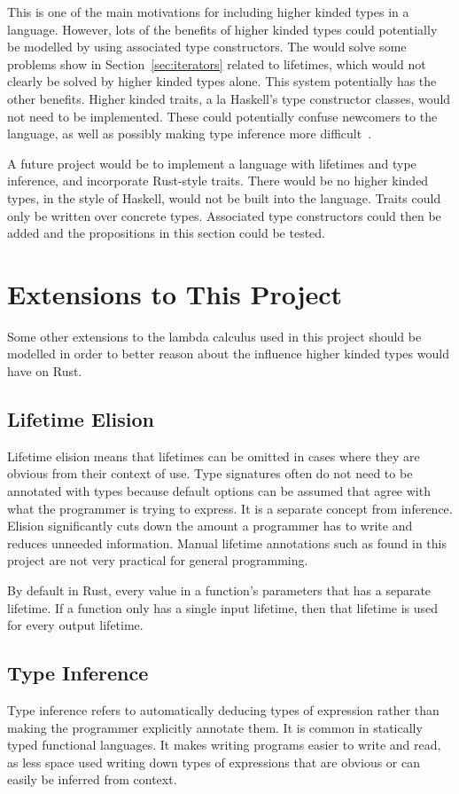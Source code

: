 This is one of the main motivations for including higher kinded types in a
language.  However, lots of the benefits of higher kinded types could
potentially be modelled by using associated type constructors. The would solve
some problems show in Section~\ref{sec:iterators} related to lifetimes, which
would not clearly be solved by higher kinded types alone. This system
potentially has the other benefits.  Higher kinded traits, a la Haskell's type
constructor classes, would not need to be implemented. These could potentially
confuse newcomers to the language, as well as possibly making type inference
more difficult~\cite{niko}.

A future project would be to implement a language with lifetimes and type
inference, and incorporate Rust-style traits. There would be no higher kinded
types, in the style of Haskell, would not be built into the language. Traits
could only be written over concrete types. Associated type constructors could
then be added and the propositions in this section could be tested.

\section{Extensions to This Project}
Some other extensions to the lambda calculus used in this project should be
modelled in order to better reason about the influence higher kinded types
would have on Rust.

\subsection{Lifetime Elision} Lifetime elision means that lifetimes can be omitted
in cases where they are obvious from their context of use. Type signatures
often do not need to be annotated with types because default options can be
assumed that agree with what the programmer is trying to express. It is a
separate concept from inference. Elision significantly cuts down the amount a
programmer has to write and reduces unneeded information. Manual lifetime
annotations such as found in this project are not very practical for general
programming.

By default in Rust, every value in a function's parameters that has a separate
lifetime. If a function only has a single input lifetime, then that lifetime is
used for every output lifetime.

\subsection{Type Inference}
Type inference refers to automatically deducing types of expression rather than
making the programmer explicitly annotate them. It is common in statically
typed functional languages. It makes writing programs easier to write and read,
as less space used writing down types of expressions that are obvious or can
easily be inferred from context.

